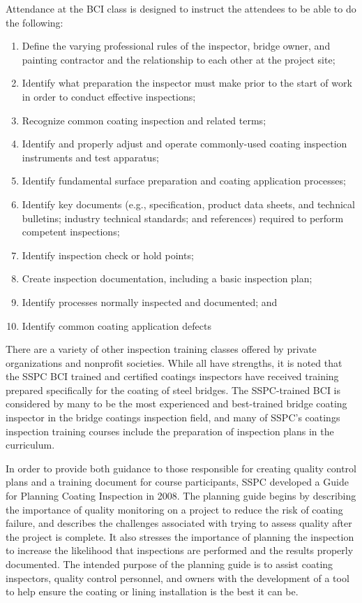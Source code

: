 Attendance at the BCI class is designed to instruct the attendees to be able to do the following:
\begin{enumerate}
  \item Define the varying professional rules of the inspector, bridge owner, and painting contractor and the relationship to each other at the project site;
  \item Identify what preparation the inspector must make prior to the start of work in order to conduct effective inspections;
  \item Recognize common coating inspection and related terms;
  \item Identify and properly adjust and operate commonly-used coating inspection instruments and test
  apparatus;
  \item Identify fundamental surface preparation and coating application processes;
  \item Identify key documents (e.g., specification, product data sheets, and technical bulletins; industry
  technical standards; and references) required to perform competent inspections;
  \item Identify inspection check or hold points;
  \item Create inspection documentation, including a basic inspection plan;
  \item Identify processes normally inspected and documented; and
  \item Identify common coating application defects
\end{enumerate}

There are a variety of other inspection training classes offered by private organizations and nonprofit societies.
While all have strengths, it is noted that the SSPC BCI trained and certified coatings inspectors have received
training prepared specifically for the coating of steel bridges. The SSPC-trained BCI is considered by many to be the
most experienced and best-trained bridge coating inspector in the bridge coatings inspection field, and many of
SSPC’s coatings inspection training courses include the preparation of inspection plans in the curriculum.

In order to provide both guidance to those responsible for creating quality control plans and a training document
for course participants, SSPC developed a Guide for Planning Coating Inspection in 2008. The planning guide
begins by describing the importance of quality monitoring on a project to reduce the risk of coating failure, and
describes the challenges associated with trying to assess quality after the project is complete. It also stresses the
importance of planning the inspection to increase the likelihood that inspections are performed and the results
properly documented. The intended purpose of the planning guide is to assist coating inspectors, quality control
personnel, and owners with the development of a tool to help ensure the coating or lining installation is the best it can
be.

